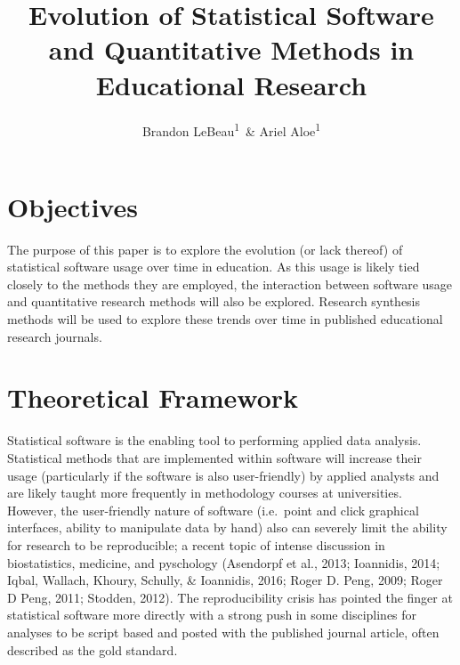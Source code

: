 \documentclass[english,floatsintext,man]{apa6}
\title{Evolution of Statistical Software and Quantitative Methods in
Educational Research}
\author{Brandon LeBeau\textsuperscript{1}~\& Ariel Aloe\textsuperscript{1}}
\affiliation{
    \vspace{0.5cm}
          \textsuperscript{1} University of Iowa  }
\theoremstyle{definition}
\theoremstyle{definition}
\theoremstyle{remark}
\begin{document}
\maketitle

\setcounter{secnumdepth}{0}



\section{Objectives}\label{objectives}

The purpose of this paper is to explore the evolution (or lack thereof)
of statistical software usage over time in education. As this usage is
likely tied closely to the methods they are employed, the interaction
between software usage and quantitative research methods will also be
explored. Research synthesis methods will be used to explore these
trends over time in published educational research journals.

\section{Theoretical Framework}\label{theoretical-framework}

Statistical software is the enabling tool to performing applied data
analysis. Statistical methods that are implemented within software will
increase their usage (particularly if the software is also
user-friendly) by applied analysts and are likely taught more frequently
in methodology courses at universities. However, the user-friendly
nature of software (i.e.~point and click graphical interfaces, ability
to manipulate data by hand) also can severely limit the ability for
research to be reproducible; a recent topic of intense discussion in
biostatistics, medicine, and pyschology (Asendorpf et al., 2013;
Ioannidis, 2014; Iqbal, Wallach, Khoury, Schully, \& Ioannidis, 2016;
Roger D. Peng, 2009; Roger D Peng, 2011; Stodden, 2012). The
reproducibility crisis has pointed the finger at statistical software
more directly with a strong push in some disciplines for analyses to be
script based and posted with the published journal article, often
described as the gold standard.
\end{document}
